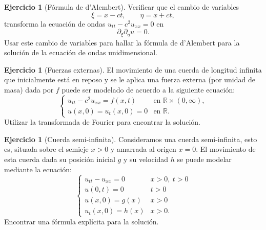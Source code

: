 \documentclass[12pt, a4paper]{amsbook}
\newcommand{\R}{{\mathbb R}}
\theoremstyle{remark}
\theoremstyle{definition}
\newtheorem{ejer}[teo]{Ejercicio}
\numberwithin{section}{chapter}
\numberwithin{subsection}{section}
\numberwithin{equation}{section}
\numberwithin{figure}{chapter}
\begin{document}
\begin{ejer}[Fórmula de d'Alembert] Verificar que el cambio de variables 
$$
\xi = x - ct,\qquad \eta = x + c t,
$$
transforma la ecuación de ondas $u_{tt} - c^2 u_{xx} = 0$ en
$$
\partial_\xi\partial_\eta u = 0.
$$
Usar este cambio de variables para hallar la fórmula de d'Alembert para la solución de la ecuación de ondas unidimensional.
\end{ejer} 


\begin{ejer}[Fuerzas externas]  El movimiento de una cuerda de longitud infinita que inicialmente está en reposo y se le aplica una fuerza externa (por unidad de masa) dada por $f$ puede ser modelado de acuerdo a la siguiente ecuación:
$$
\begin{cases}
 u_{tt} - c^2  u_{xx} = f(x,t) & \text{en } \R \times(0,\infty),\\
u(x,0) =  u_t(x,0) = 0 & \text{en } \R.
\end{cases}
$$
Utilizar la transformada de Fourier para encontrar la solución.
\end{ejer}




\begin{ejer}[Cuerda semi-infinita] Consideramos una cuerda semi-infinita, esto es, situada sobre el semieje $x>0$ y amarrada al origen $x=0$. El movimiento de esta cuerda dada su posición inicial $g$ y su velocidad $h$ se puede modelar mediante la ecuación:
$$
\begin{cases}
 u_{tt} -  u_{xx} = 0 & x>0,\ t>0\\
u(0,t) = 0 & t>0\\
u(x,0) = g(x) & x>0\\
u_t(x,0) = h(x)& x>0.
\end{cases}
$$
Encontrar una fórmula explícita para la solución.
\end{ejer}
\end{document}
